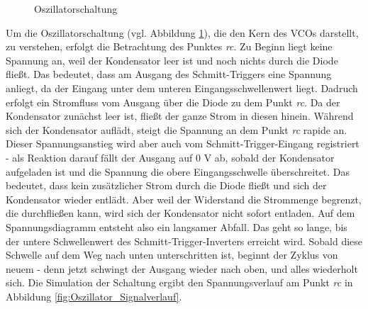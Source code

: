 \begin{figure}[h]
	\centering
	\setlength{\fboxsep}{1pt} %
	\setlength{\fboxrule}{1pt} %
	\caption{Oszillatorschaltung}
	\label{fig:Oszillatorschaltung}
\end{figure}

Um die Oszillatorschaltung (vgl. Abbildung \ref{fig:Oszillatorschaltung}), die den Kern des VCOs darstellt, zu verstehen, erfolgt die Betrachtung des Punktes \textit{rc}.
Zu Beginn liegt keine Spannung an, weil der Kondensator leer ist und noch nichts durch die Diode fließt. 
Das bedeutet, dass am Ausgang des Schmitt-Triggers eine Spannung anliegt, da der Eingang unter dem unteren Eingangsschwellenwert liegt. 
Dadruch erfolgt ein Stromfluss vom Ausgang über die Diode zu dem Punkt \textit{rc}. 
Da der Kondensator zunächst leer ist, fließt der ganze Strom in diesen hinein.
Während sich der Kondensator auflädt, steigt die Spannung an dem Punkt \textit{rc} rapide an.
Dieser Spannungsanstieg wird aber auch vom Schmitt-Trigger-Eingang registriert - als Reaktion darauf fällt der Ausgang auf 0 V ab, sobald der Kondensator aufgeladen ist und die Spannung die obere Eingangsschwelle überschreitet.
Das bedeutet, dass kein zusätzlicher Strom durch die Diode fließt und sich der Kondensator wieder entlädt. 
Aber weil der Widerstand die Strommenge begrenzt, die durchfließen kann, wird sich der Kondensator nicht sofort entladen. 
Auf dem Spannungsdiagramm entsteht also ein langsamer Abfall. 
Das geht so lange, bis der untere Schwellenwert des Schmitt-Trigger-Inverters erreicht wird. 
Sobald diese Schwelle auf dem Weg nach unten unterschritten ist, beginnt der Zyklus von neuem - denn jetzt schwingt der Ausgang wieder nach oben, und alles wiederholt sich.
Die Simulation der Schaltung ergibt den Spannungsverlauf am Punkt \textit{rc} in Abbildung \ref{fig:Oszillator_Signalverlauf}.

